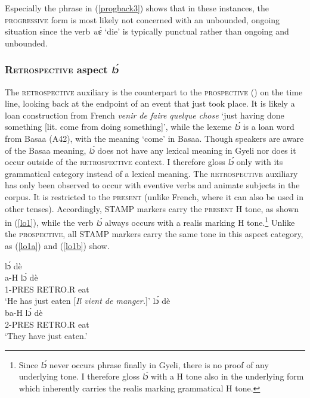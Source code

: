 \noindent Especially the phrase in (\ref{progback3}) shows that in these instances, the \textsc{progressive} form is most likely not concerned with an unbounded, ongoing situation since the verb {\itshape wɛ̀} `die' is typically punctual rather than ongoing and unbounded.



\subsubsection{\textsc{Retrospective} aspect {\itshape lɔ́}}


The \textsc{retrospective} auxiliary is the counterpart to the \textsc{prospective} () on the time line, looking back at the endpoint of an event that just took place. It is likely a loan construction from French {\itshape venir de faire quelque chose} `just having done something [lit. come from doing something]', while the lexeme {\itshape lɔ́} is a loan word from Basaa (A42), with the meaning `come' in Basaa. Though speakers are aware of the Basaa meaning, {\itshape lɔ́} does not have any lexical meaning in Gyeli nor does it occur outside of the \textsc{retrospective} context. I therefore gloss {\itshape lɔ́} only with its grammatical category instead of a lexical meaning. The \textsc{retrospective} auxiliary has only been observed to occur with eventive verbs and animate subjects in the corpus. It is restricted to the \textsc{present} (unlike French, where it can also be used in other tenses). Accordingly, STAMP markers carry the \textsc{present} H tone, as shown in (\ref{lo1}), while the verb {\itshape lɔ́} always occurs with a realis marking H tone.\footnote{Since {\itshape lɔ́} never occurs phrase finally in Gyeli, there is no proof of any underlying tone. I therefore gloss {\itshape lɔ́} with a H tone also in the underlying form which inherently carries the realis marking grammatical H tone.} Unlike the \textsc{prospective}, all STAMP markers carry the same tone in this aspect category, as (\ref{lo1a}) and (\ref{lo1b}) show.


\begin{exe}  
\ex\label{lo1} 
\begin{xlist} 
\ex\label{lo1a}
   lɔ́ dè \\
           a-H lɔ́ dè \\
            1-PRES RETRO.R eat  \\
    \trans `He has just eaten [{\itshape Il vient de manger.}]'
\ex\label{lo1b}
   lɔ́ dè \\
         ba-H lɔ́ dè \\
             2-PRES RETRO.R eat   \\
    \trans `They have just eaten.'
\end{xlist}
\end{exe}




